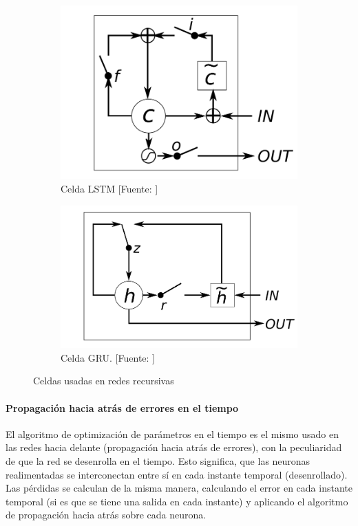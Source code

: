 \begin{figure}
	\begin{subfigure}[b]{0.5\textwidth}
		\centering
		\includegraphics[width=\linewidth]{imagenes/metodos/lstm.png}
		\caption{Celda LSTM [Fuente: \cite{chung2014empirical}]}
		\label{fig:metodos/lstm}
	\end{subfigure}
	\begin{subfigure}[b]{0.5\textwidth}
		\centering
		\includegraphics[width=\linewidth]{imagenes/metodos/gru.png}
		\caption{Celda GRU. [Fuente: \cite{chung2014empirical}]}
		\label{fig:metodos/gru}
	\end{subfigure}
	\caption{Celdas usadas en redes recursivas}
\end{figure}
\paragraph{Propagación hacia atrás de errores en el tiempo}
El algoritmo de optimización de parámetros en el tiempo es el mismo usado en las redes hacia delante (propagación hacia atrás de errores), con la peculiaridad de que la red se desenrolla en el tiempo. Esto significa, que las neuronas realimentadas se interconectan entre sí en cada instante temporal (desenrollado). Las pérdidas se calculan de la misma manera, calculando el error en cada instante temporal (si es que se tiene una salida en cada instante) y aplicando el algoritmo de propagación hacia atrás sobre cada neurona.

